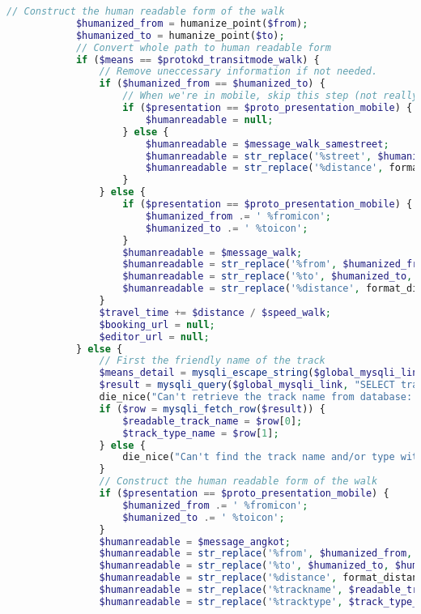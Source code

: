 \begin{lstlisting}[language=PHP,basicstyle=\tiny,caption=handle.php,label={lst:handle.php}]
			// Construct the human readable form of the walk
			$humanized_from = humanize_point($from);
			$humanized_to = humanize_point($to);
			// Convert whole path to human readable form
			if ($means == $protokd_transitmode_walk) {
				// Remove uneccessary information if not needed.
				if ($humanized_from == $humanized_to) {
					// When we're in mobile, skip this step (not really necessary)
					if ($presentation == $proto_presentation_mobile) {
						$humanreadable = null;
					} else {
						$humanreadable = $message_walk_samestreet;
						$humanreadable = str_replace('%street', $humanized_from, $humanreadable);
						$humanreadable = str_replace('%distance', format_distance($distance, $locale), $humanreadable);
					}
				} else {
					if ($presentation == $proto_presentation_mobile) {
						$humanized_from .= ' %fromicon';
						$humanized_to .= ' %toicon';
					}
					$humanreadable = $message_walk;
					$humanreadable = str_replace('%from', $humanized_from, $humanreadable);
					$humanreadable = str_replace('%to', $humanized_to, $humanreadable);
					$humanreadable = str_replace('%distance', format_distance($distance, $locale), $humanreadable);
				}
				$travel_time += $distance / $speed_walk;
				$booking_url = null;
				$editor_url = null;
			} else {
				// First the friendly name of the track
				$means_detail = mysqli_escape_string($global_mysqli_link, $means_detail);
				$result = mysqli_query($global_mysqli_link, "SELECT tracks.trackname, tracktypes.name, tracktypes.url, tracks.extraParameters, tracktypes.speed, tracks.internalInfo FROM tracks JOIN tracktypes ON tracktypes.trackTypeId='$means' AND tracks.trackTypeId='$means' AND tracks.trackid='$means_detail'") or
				die_nice("Can't retrieve the track name from database: " . mysqli_error($global_mysqli_link));
				if ($row = mysqli_fetch_row($result)) {
					$readable_track_name = $row[0];
					$track_type_name = $row[1];
				} else {
					die_nice("Can't find the track name and/or type with the given track id '$means_detail'");
				}
				// Construct the human readable form of the walk
				if ($presentation == $proto_presentation_mobile) {
					$humanized_from .= ' %fromicon';
					$humanized_to .= ' %toicon';
				}
				$humanreadable = $message_angkot;
				$humanreadable = str_replace('%from', $humanized_from, $humanreadable);
				$humanreadable = str_replace('%to', $humanized_to, $humanreadable);
				$humanreadable = str_replace('%distance', format_distance($distance, $locale), $humanreadable);
				$humanreadable = str_replace('%trackname', $readable_track_name, $humanreadable);
				$humanreadable = str_replace('%tracktype', $track_type_name, $humanreadable);
				

\end{lstlisting}
